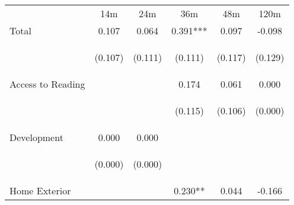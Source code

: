 \begin{tabular}{lccccc}
\hline \noalign{\smallskip} & 14m & 24m & 36m & 48m & 120m\\
\noalign{\smallskip}\hline \noalign{\smallskip}Total & 0.107 & 0.064 & 0.391*** & 0.097 & -0.098\\
 & \begin{footnotesize}(0.107)\end{footnotesize} & \begin{footnotesize}(0.111)\end{footnotesize} & \begin{footnotesize}(0.111)\end{footnotesize} & \begin{footnotesize}(0.117)\end{footnotesize} & \begin{footnotesize}(0.129)\end{footnotesize}\\
\noalign{\smallskip}Access to Reading &  &  & 0.174 & 0.061 & 0.000\\
 & \begin{footnotesize}\end{footnotesize} & \begin{footnotesize}\end{footnotesize} & \begin{footnotesize}(0.115)\end{footnotesize} & \begin{footnotesize}(0.106)\end{footnotesize} & \begin{footnotesize}(0.000)\end{footnotesize}\\
\noalign{\smallskip}Development & 0.000 & 0.000 &  &  & \\
 & \begin{footnotesize}(0.000)\end{footnotesize} & \begin{footnotesize}(0.000)\end{footnotesize} & \begin{footnotesize}\end{footnotesize} & \begin{footnotesize}\end{footnotesize} & \begin{footnotesize}\end{footnotesize}\\
\noalign{\smallskip}Home Exterior &  &  & 0.230** & 0.044 & -0.166\\

\end{tabular}
